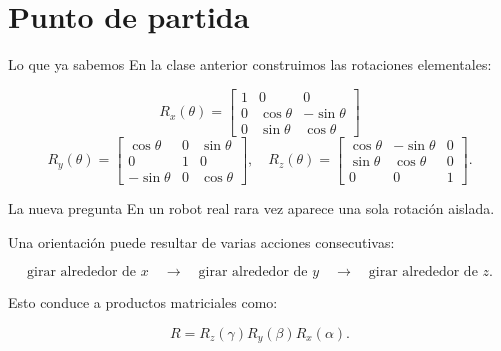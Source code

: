 \documentclass[aspectratio=169,10pt]{beamer}
\begin{document}
\section{Punto de partida}

\begin{frame}{Lo que ya sabemos}
    \small
    En la clase anterior construimos las rotaciones elementales:

    \[
    R_x(\theta)=
    \begin{bmatrix}
        1&0&0\\
        0&\cos\theta&-\sin\theta\\
        0&\sin\theta&\cos\theta
    \end{bmatrix}
    \]
\vspace{0.3cm}
    \[
    R_y(\theta)=
    \begin{bmatrix}
        \cos\theta&0&\sin\theta\\
        0&1&0\\
        -\sin\theta&0&\cos\theta
    \end{bmatrix},
    \quad
    R_z(\theta)=
    \begin{bmatrix}
        \cos\theta&-\sin\theta&0\\
        \sin\theta&\cos\theta&0\\
        0&0&1
    \end{bmatrix}.
    \]

\end{frame}

\begin{frame}{La nueva pregunta}
    \small
    En un robot real rara vez aparece una sola rotación aislada.

    \vspace{0.15cm}
    Una orientación puede resultar de varias acciones consecutivas:

    \[
    \text{girar alrededor de }x
    \quad\rightarrow\quad
    \text{girar alrededor de }y
    \quad\rightarrow\quad
    \text{girar alrededor de }z.
    \]

    \vspace{0.15cm}
    Esto conduce a productos matriciales como:

    \[
    R=R_z(\gamma)R_y(\beta)R_x(\alpha).
    \]


\end{frame}
\end{document}
